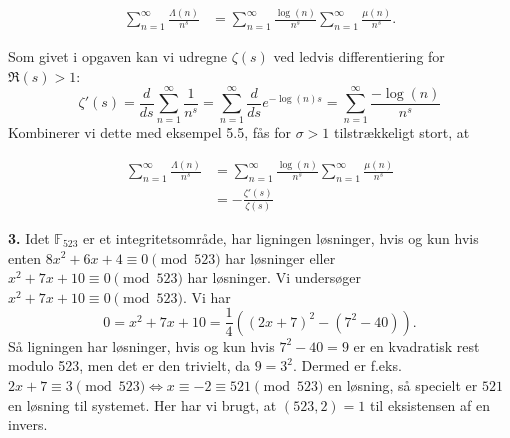 \documentclass[a4paper]{article}
\begin{document}
    \begin{align*}
        \sum_{n=1}^{\infty} \frac{\Lambda (n)}{n^{s}} 
        &= \sum_{n=1}^{\infty} \frac{\log (n)}{n^{s}}
        \sum_{n=1}^{\infty} \frac{\mu (n)}{n^{s}}.
    \end{align*}

    Som givet i opgaven kan vi udregne $\zeta (s)$ ved ledvis differentiering
    for $\Re(s) > 1$:
    \[
    \zeta'(s) = \frac{d}{ds} \sum_{n=1}^{\infty} \frac{1}{n^{s}}
    = \sum_{n=1}^{\infty} \frac{d}{ds} e^{- \log (n) s}
    = \sum_{n=1}^{\infty} \frac{-\log (n)}{n^{s}}
    \] 
    Kombinerer vi dette med eksempel 5.5, fås for $\sigma>1$ tilstrækkeligt
    stort, at

    \begin{align*}
        \sum_{n=1}^{\infty} \frac{\Lambda (n)}{n^{s}} 
        &= \sum_{n=1}^{\infty} \frac{\log (n)}{n^{s}}
        \sum_{n=1}^{\infty} \frac{\mu (n)}{n^{s}}\\
        &= - \frac{\zeta'(s)}{\zeta(s)}
    \end{align*}


    \textbf{3.} Idet $\mathbb{F}_{523}$ er et integritetsområde, har ligningen
    løsninger, hvis og kun hvis enten $8x^2 + 6x +4 \equiv 0 \pmod{523}$ har
    løsninger eller $x^2 + 7x +10 \equiv 0 \pmod{523}$ har løsninger. 
    Vi undersøger $x^2 + 7x +10 \equiv 0 \pmod{523}$. Vi har
    \[
    0 = x^2 + 7x +10 = \frac{1}{4}\left( \left( 2x +7 \right)^2
    - \left( 7^2 - 40 \right) \right).
    \] 
    Så ligningen har løsninger, hvis og kun hvis 
    $7^2 -40 = 9$ er en kvadratisk rest modulo 523, men det er den trivielt, da
    $9 = 3^2$. Dermed er f.eks.
    $2x + 7 \equiv 3 \pmod{523} \iff x \equiv -2 \equiv 521\pmod{523}$ en
    løsning, så specielt er $521$ en løsning til systemet. Her har vi brugt, at
    $(523,2)=1$ til eksistensen af en invers.
\end{document}
